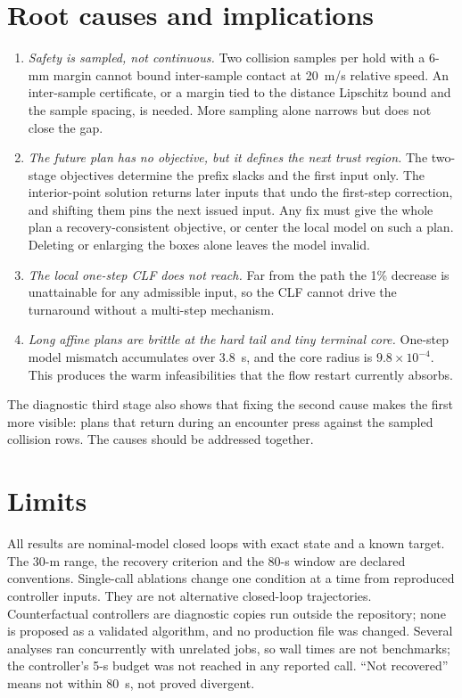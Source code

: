 \documentclass[11pt]{article}
\begin{document}
\section{Root causes and implications}
\begin{enumerate}
\item \emph{Safety is sampled, not continuous.} Two collision samples per hold
with a 6-mm margin cannot bound inter-sample contact at 20~m/s relative speed.
An inter-sample certificate, or a margin tied to the distance Lipschitz bound
and the sample spacing, is needed. More sampling alone narrows but does not
close the gap.
\item \emph{The future plan has no objective, but it defines the next trust
region.} The two-stage objectives determine the prefix slacks and the first
input only. The interior-point solution returns later inputs that undo the
first-step correction, and shifting them pins the next issued input. Any fix
must give the whole plan a recovery-consistent objective, or center the local
model on such a plan. Deleting or enlarging the boxes alone leaves the model
invalid.
\item \emph{The local one-step CLF does not reach.} Far from the path the 1\%
decrease is unattainable for any admissible input, so the CLF cannot drive the
turnaround without a multi-step mechanism.
\item \emph{Long affine plans are brittle at the hard tail and tiny terminal
core.} One-step model mismatch accumulates over 3.8~s, and the core radius is
$9.8\times10^{-4}$. This produces the warm infeasibilities that the flow
restart currently absorbs.
\end{enumerate}
The diagnostic third stage also shows that fixing the second cause makes the
first more visible: plans that return during an encounter press against the
sampled collision rows. The causes should be addressed together.

\section{Limits}
All results are nominal-model closed loops with exact state and a known
target. The 30-m range, the recovery criterion and the 80-s window are declared
conventions. Single-call ablations change one condition at a time from
reproduced controller inputs. They are not alternative closed-loop
trajectories. Counterfactual controllers are diagnostic copies run outside the
repository; none is proposed as a validated algorithm, and no production file
was changed. Several analyses ran concurrently with unrelated jobs, so wall
times are not benchmarks; the controller's 5-s budget was not reached in any
reported call. ``Not recovered'' means not within 80~s, not proved divergent.
\end{document}
